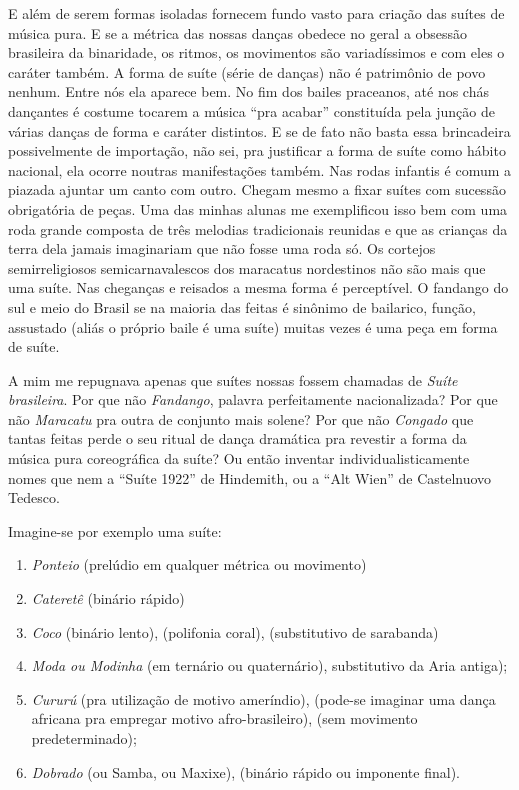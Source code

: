 E além de serem formas isoladas fornecem fundo vasto para criação das
suítes de música pura. E se a métrica das nossas danças obedece no geral
a obsessão brasileira da binaridade, os ritmos, os movimentos são
variadíssimos e com eles o caráter também. A forma de suíte (série de
danças) não é patrimônio de povo nenhum. Entre nós ela aparece bem. No
fim dos bailes praceanos, até nos chás dançantes é costume tocarem a
música ``pra acabar'' constituída pela junção de várias danças de forma e
caráter distintos. E se de fato não basta essa brincadeira possivelmente
de importação, não sei, pra justificar a forma de suíte como hábito
nacional, ela ocorre noutras manifestações também. Nas rodas infantis é
comum a piazada ajuntar um canto com outro. Chegam mesmo a fixar suítes
com sucessão obrigatória de peças. Uma das minhas alunas me exemplificou
isso bem com uma roda grande composta de três melodias tradicionais
reunidas e que as crianças da terra dela jamais imaginariam que não
fosse uma roda só. Os cortejos semirreligiosos semicarnavalescos dos
maracatus nordestinos não são mais que uma suíte. Nas cheganças e
reisados a mesma forma é perceptível. O fandango do sul e meio do Brasil
se na maioria das feitas é sinônimo de bailarico, função, assustado
(aliás o próprio baile é uma suíte) muitas vezes é uma peça em forma de
suíte.

A mim me repugnava apenas que suítes nossas fossem chamadas de \textit{Suíte
brasileira}. Por que não \textit{Fandango}, palavra perfeitamente
nacionalizada? Por que não \textit{Maracatu} pra outra de conjunto mais solene?
Por que não \textit{Congado} que tantas feitas perde o seu ritual de dança
dramática pra revestir a forma da música pura coreográfica da suíte? Ou
então inventar individualisticamente nomes que nem a ``Suíte 1922'' de
Hindemith, ou a ``Alt Wien'' de Castelnuovo Tedesco.

Imagine-se por exemplo uma suíte:

\begin{enumerate}
\item\textit{Ponteio} (prelúdio em qualquer métrica ou movimento)

\item\textit{Cateretê} (binário rápido)

\item\textit{Coco} (binário lento), (polifonia coral), (substitutivo de sarabanda)

\item\textit{Moda ou Modinha} (em ternário ou quaternário), substitutivo da Aria antiga);

\item\textit{Cururú} (pra utilização de motivo ameríndio), (pode-se imaginar
  uma dança africana pra empregar motivo afro-brasileiro), (sem
  movimento predeterminado);

\item\textit{Dobrado} (ou Samba, ou Maxixe), (binário rápido ou imponente final).
\end{enumerate}

